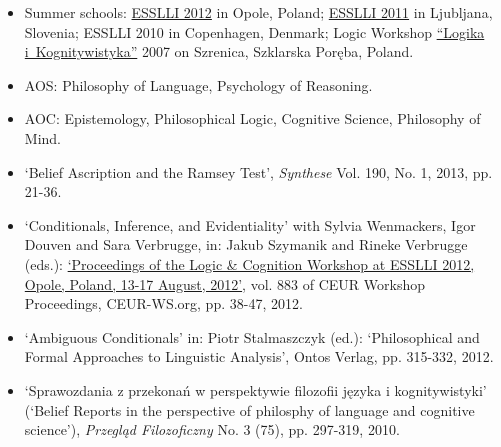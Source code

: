 \documentclass[a4paper,12pt]{article}
\begin{document}
\begin{small}
\begin{itemize}
  \item Summer schools: %
    \href{http://www.esslli2012.pl}{ESSLLI 2012} in Opole, Poland;
    \href{http://esslli2011.ijs.si}{ESSLLI 2011} in Ljubljana, Slovenia;
    ESSLLI 2010 in Copenhagen, Denmark;
    Logic Workshop \href{http://www.logika.uw.edu.pl/warsztaty2007/index.html}{``Logika i~Kognitywistyka''} 2007 on
    Szrenica, Szklarska Poręba, Poland.
  \end{itemize}
  
  \begin{itemize}
  \item AOS: Philosophy of Language, Psychology of Reasoning.
  \item AOC: Epistemology, Philosophical Logic, Cognitive Science, Philosophy
    of Mind.
  \end{itemize}

  
  
  
  \begin{itemize}
  \item `Belief Ascription and the Ramsey Test', \emph{Synthese}
    Vol. 190, No. 1, 2013, pp. 21-36. %

  \item `Conditionals, Inference, and Evidentiality' with Sylvia
    Wenmackers, Igor Douven and Sara Verbrugge, in: Jakub Szymanik and
    Rineke Verbrugge (eds.):
    \href{http://ceur-ws.org/Vol-883/}{`Proceedings of the Logic \&
      Cognition Workshop at ESSLLI 2012, Opole, Poland, 13-17 August,
      2012'}, vol. 883 of CEUR Workshop Proceedings, CEUR-WS.org,
    pp. 38-47, 2012.

  \item `Ambiguous Conditionals' in: Piotr Stalmaszczyk (ed.):
    `Philosophical and Formal Approaches to Linguistic Analysis',
    Ontos Verlag, pp. 315-332, 2012.

  \item `Sprawozdania z przekonań w perspektywie filozofii języka i
    kognitywistyki' (`Belief Reports in the perspective of philosphy
    of language and cognitive science'), \emph{Przegląd Filozoficzny}
    No. 3 (75), pp. 297-319, 2010.


\end{itemize}
\end{small}
\end{document}
